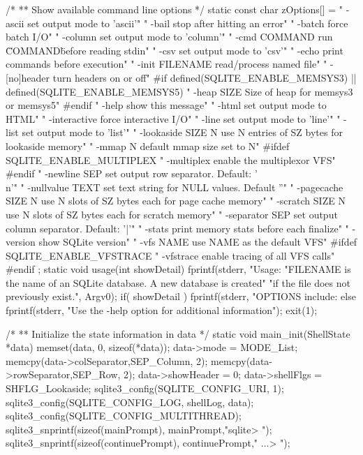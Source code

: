 \begin{Codex}[label=shell.c,numbers=left]
/*
** Show available command line options
*/
static const char zOptions[] = 
  "   -ascii               set output mode to 'ascii'\n"
  "   -bail                stop after hitting an error\n"
  "   -batch               force batch I/O\n"
  "   -column              set output mode to 'column'\n"
  "   -cmd COMMAND         run \"COMMAND\" before reading stdin\n"
  "   -csv                 set output mode to 'csv'\n"
  "   -echo                print commands before execution\n"
  "   -init FILENAME       read/process named file\n"
  "   -[no]header          turn headers on or off\n"
#if defined(SQLITE_ENABLE_MEMSYS3) || defined(SQLITE_ENABLE_MEMSYS5)
  "   -heap SIZE           Size of heap for memsys3 or memsys5\n"
#endif
  "   -help                show this message\n"
  "   -html                set output mode to HTML\n"
  "   -interactive         force interactive I/O\n"
  "   -line                set output mode to 'line'\n"
  "   -list                set output mode to 'list'\n"
  "   -lookaside SIZE N    use N entries of SZ bytes for lookaside memory\n"
  "   -mmap N              default mmap size set to N\n"
#ifdef SQLITE_ENABLE_MULTIPLEX
  "   -multiplex           enable the multiplexor VFS\n"
#endif
  "   -newline SEP         set output row separator. Default: '\\n'\n"
  "   -nullvalue TEXT      set text string for NULL values. Default ''\n"
  "   -pagecache SIZE N    use N slots of SZ bytes each for page cache memory\n"
  "   -scratch SIZE N      use N slots of SZ bytes each for scratch memory\n"
  "   -separator SEP       set output column separator. Default: '|'\n"
  "   -stats               print memory stats before each finalize\n"
  "   -version             show SQLite version\n"
  "   -vfs NAME            use NAME as the default VFS\n"
#ifdef SQLITE_ENABLE_VFSTRACE
  "   -vfstrace            enable tracing of all VFS calls\n"
#endif
;
static void usage(int showDetail){
  fprintf(stderr,
      "Usage: %
      "FILENAME is the name of an SQLite database. A new database is created\n"
      "if the file does not previously exist.\n", Argv0);
  if( showDetail ){
    fprintf(stderr, "OPTIONS include:\n%
  }else{
    fprintf(stderr, "Use the -help option for additional information\n");
  }
  exit(1);
}

/*
** Initialize the state information in data
*/
static void main_init(ShellState *data) {
  memset(data, 0, sizeof(*data));
  data->mode = MODE_List;
  memcpy(data->colSeparator,SEP_Column, 2);
  memcpy(data->rowSeparator,SEP_Row, 2);
  data->showHeader = 0;
  data->shellFlgs = SHFLG_Lookaside;
  sqlite3_config(SQLITE_CONFIG_URI, 1);
  sqlite3_config(SQLITE_CONFIG_LOG, shellLog, data);
  sqlite3_config(SQLITE_CONFIG_MULTITHREAD);
  sqlite3_snprintf(sizeof(mainPrompt), mainPrompt,"sqlite> ");
  sqlite3_snprintf(sizeof(continuePrompt), continuePrompt,"   ...> ");
}


\end{Codex}
